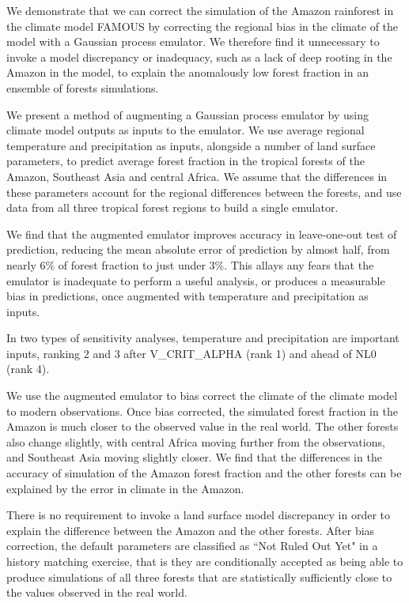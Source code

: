 \documentclass[gmd, manuscript]{copernicus}
\begin{document}
\conclusions

We demonstrate that we can correct the simulation of the Amazon rainforest in the climate model FAMOUS by correcting the regional bias in the climate of the model with a Gaussian process emulator. We therefore find it unnecessary to invoke a model discrepancy or inadequacy, such as a lack of deep rooting in the Amazon in the model, to explain the anomalously low forest fraction in an ensemble of forests simulations. 

We present a method of augmenting a Gaussian process emulator by using climate model outputs as inputs to the emulator. We use average regional temperature and precipitation as inputs, alongside a number of land surface parameters, to predict average forest fraction in the tropical forests of the Amazon, Southeast Asia and central Africa. We assume that the differences in these parameters account for the regional differences between the forests, and use data from all three tropical forest regions to build a single emulator.

We find that the augmented emulator improves accuracy in leave-one-out test of prediction, reducing the mean absolute error of prediction by almost half, from nearly 6\% of forest fraction to just under 3\%. This allays any fears that the emulator is inadequate to perform a useful analysis, or produces a measurable bias in predictions, once augmented with temperature and precipitation as inputs.

In two types of sensitivity analyses, temperature and precipitation are important inputs, ranking 2 and 3 after V\_CRIT\_ALPHA (rank 1) and ahead of NL0 (rank 4).

We use the augmented emulator to bias correct the climate of the climate model to modern observations. Once bias corrected, the simulated forest fraction in the Amazon is much closer to the observed value in the real world. The other forests also change slightly, with central Africa moving further from the observations, and Southeast Asia moving slightly closer. We find that the differences in the accuracy of simulation of the Amazon forest fraction and the other forests can be explained by the error in climate in the Amazon.

There is no requirement to invoke a land surface model discrepancy in order to explain the difference between the Amazon and the other forests. After bias correction, the default parameters are classified as ``Not Ruled Out Yet" in a history matching exercise, that is they are conditionally accepted as being able to produce simulations of all three forests that are statistically sufficiently close to the values observed in the real world.
\end{document}
